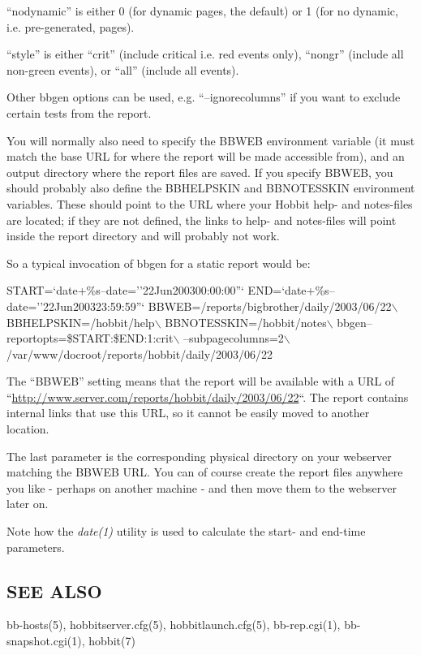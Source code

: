   ``nodynamic'' is either 0 (for dynamic pages, the default) or 1 (for no dynamic, i.e. pre-generated, pages). 


  ``style'' is either ``crit'' (include critical i.e. red events only), ``nongr'' (include all non-green events), or ``all'' (include all events). 


  Other bbgen options can be used, e.g. ``--ignorecolumns'' if you want to exclude certain tests from the report. 


  You will normally also need to specify the BBWEB environment
  variable (it must match the base URL for where the report will be
  made accessible from), and an output directory where the report
  files are saved. If you specify BBWEB, you should probably also
  define the BBHELPSKIN and BBNOTESSKIN environment variables. These
  should point to the URL where your Hobbit help- and notes-files are
  located; if they are not defined, the links to help- and notes-files
  will point inside the report directory and will probably not work. 



  So a typical invocation of bbgen for a static report would be: 


  
START=`date+\%s--date=''22Jun200300:00:00''`  
END=`date+\%s--date=''22Jun200323:59:59''`  
BBWEB=/reports/bigbrother/daily/2003/06/22$\backslash$  
BBHELPSKIN=/hobbit/help$\backslash$  
BBNOTESSKIN=/hobbit/notes$\backslash$  
bbgen--reportopts=\$START:\$END:1:crit$\backslash$  
--subpagecolumns=2$\backslash$  
/var/www/docroot/reports/hobbit/daily/2003/06/22 


  The ``BBWEB'' setting means that the report will be available with a
  URL of
  ``\url{http://www.server.com/reports/hobbit/daily/2003/06/22}``. The
  report contains internal links that use this URL, so it cannot be
  easily moved to another location. 



  The last parameter is the corresponding physical directory on your
  webserver matching the BBWEB URL. You can of course create the
  report files anywhere you like - perhaps on another machine - and
  then move them to the webserver later on. 



  Note how the \emph{date(1)}
 utility is used to calculate the start- and end-time parameters. 


 
\subsection{SEE ALSO}
bb-hosts(5), hobbitserver.cfg(5), hobbitlaunch.cfg(5), bb-rep.cgi(1), bb-snapshot.cgi(1), hobbit(7) 

